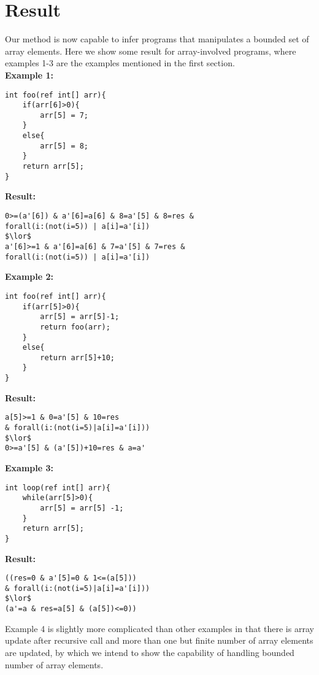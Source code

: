\documentclass[]{article}
\begin{document}
\section{Result}
Our method is now capable to infer programs that manipulates a bounded set of array elements. Here we show some result for array-involved programs, where examples 1-3 are the examples mentioned in the first section.\\

\textbf{Example 1:}\\

\begin{lstlisting}[frame=single]
int foo(ref int[] arr){
	if(arr[6]>0){
		arr[5] = 7;
	}
	else{
		arr[5] = 8;
	}
	return arr[5];
}
\end{lstlisting}
\textbf{Result:} 
\begin{lstlisting}[mathescape]
0>=(a'[6]) & a'[6]=a[6] & 8=a'[5] & 8=res & 
forall(i:(not(i=5)) | a[i]=a'[i]) 
$\lor$
a'[6]>=1 & a'[6]=a[6] & 7=a'[5] & 7=res & 
forall(i:(not(i=5)) | a[i]=a'[i])
\end{lstlisting}

\textbf{Example 2:}
\begin{lstlisting}[frame=single]
int foo(ref int[] arr){
	if(arr[5]>0){
		arr[5] = arr[5]-1;
		return foo(arr);
	}
	else{
		return arr[5]+10;
	}
}
\end{lstlisting}
\textbf{Result:}
\begin{lstlisting}[mathescape]
a[5]>=1 & 0=a'[5] & 10=res 
& forall(i:(not(i=5)|a[i]=a'[i])) 
$\lor$ 
0>=a'[5] & (a'[5])+10=res & a=a'
\end{lstlisting}

\textbf{Example 3:}
\begin{lstlisting}[frame=single]
int loop(ref int[] arr){
	while(arr[5]>0){
		arr[5] = arr[5] -1;
	}
	return arr[5];
}
\end{lstlisting}
\textbf{Result:}
\begin{lstlisting}[mathescape]
((res=0 & a'[5]=0 & 1<=(a[5]))
& forall(i:(not(i=5)|a[i]=a'[i]))
$\lor$ 
(a'=a & res=a[5] & (a[5])<=0))
\end{lstlisting}

Example 4 is slightly more complicated than other examples in that there is array update after recursive call and more than one but finite number of array elements are updated, by which we intend to show the capability of handling bounded number of array elements.\\
\end{document}
